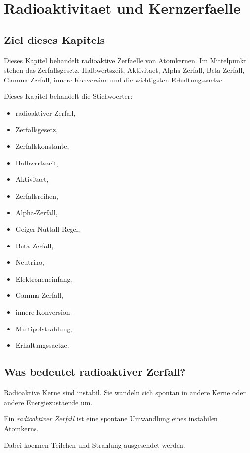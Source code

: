 \chapter{Radioaktivitaet und Kernzerfaelle}

\section{Ziel dieses Kapitels}

Dieses Kapitel behandelt radioaktive Zerfaelle von Atomkernen.
Im Mittelpunkt stehen das Zerfallsgesetz, Halbwertszeit, Aktivitaet,
Alpha-Zerfall, Beta-Zerfall, Gamma-Zerfall, innere Konversion und die wichtigsten
Erhaltungssaetze.

\begin{notebox}
Dieses Kapitel behandelt die Stichwoerter:
\begin{itemize}
    \item radioaktiver Zerfall,
    \item Zerfallsgesetz,
    \item Zerfallskonstante,
    \item Halbwertszeit,
    \item Aktivitaet,
    \item Zerfallsreihen,
    \item Alpha-Zerfall,
    \item Geiger-Nuttall-Regel,
    \item Beta-Zerfall,
    \item Neutrino,
    \item Elektroneneinfang,
    \item Gamma-Zerfall,
    \item innere Konversion,
    \item Multipolstrahlung,
    \item Erhaltungssaetze.
\end{itemize}
\end{notebox}

\section{Was bedeutet radioaktiver Zerfall?}

Radioaktive Kerne sind instabil.
Sie wandeln sich spontan in andere Kerne oder andere Energiezustaende um.

\begin{definitionbox}
Ein \emph{radioaktiver Zerfall} ist eine spontane Umwandlung eines instabilen
Atomkerns.

Dabei koennen Teilchen und Strahlung ausgesendet werden.
\end{definitionbox}

